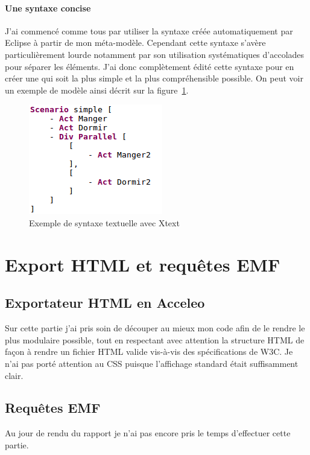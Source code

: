 \documentclass[12pt]{article}
\begin{document}
\paragraph{Une syntaxe concise}
J'ai commencé comme tous par utiliser la syntaxe créée automatiquement par Eclipse à partir de mon méta-modèle. Cependant cette syntaxe s'avère particulièrement lourde notamment par son utilisation systématiques d'accolades pour séparer les éléments. J'ai donc complètement édité cette syntaxe pour en créer une qui soit la plus simple et la plus compréhensible possible. On peut voir un exemple de modèle ainsi décrit sur la figure~\ref{Xtext}.

\begin{figure}
	\begin{center}
		\includegraphics[]{figures/xtext.png}
		\caption{Exemple de syntaxe textuelle avec Xtext}
		\label{Xtext}
	\end{center}
\end{figure}


\section{Export HTML et requêtes EMF}
\subsection{Exportateur HTML en Acceleo}
Sur cette partie j'ai pris soin de découper au mieux mon code afin de le rendre le plus modulaire possible, tout en respectant avec attention la structure HTML de façon à rendre un fichier HTML valide vis-à-vis des spécifications de W3C. Je n'ai pas porté attention au CSS puisque l'affichage standard était suffisamment clair.

\subsection{Requêtes EMF}
Au jour de rendu du rapport je n'ai pas encore pris le temps d'effectuer cette partie.
\end{document}
